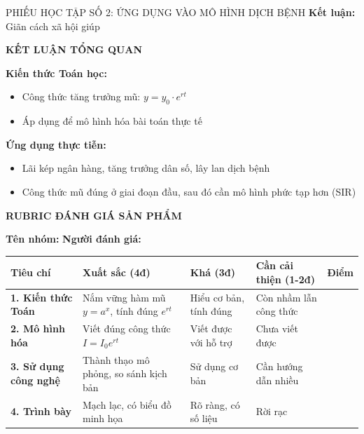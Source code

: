 \documentclass[12pt,a4paper]{article}
\begin{document}
\begin{phieuhoctap}{PHIẾU HỌC TẬP SỐ 2: ỨNG DỤNG VÀO MÔ HÌNH DỊCH BỆNH}
\textbf{Kết luận:} Giãn cách xã hội giúp \underline{\hspace{6cm}}

\vspace{0.5cm}
\textbf{\color{primary}KẾT LUẬN TỔNG QUAN}

\textbf{Kiến thức Toán học:}
\begin{itemize}
\item Công thức tăng trưởng mũ: $y = y_0 \cdot e^{rt}$
\item Áp dụng để mô hình hóa bài toán thực tế
\end{itemize}

\textbf{Ứng dụng thực tiễn:}
\begin{itemize}
\item Lãi kép ngân hàng, tăng trưởng dân số, lây lan dịch bệnh
\item Công thức mũ đúng ở giai đoạn đầu, sau đó cần mô hình phức tạp hơn (SIR)
\end{itemize}

\end{phieuhoctap}

\newpage
\begin{center}
{\Large\bfseries\sffamily\color{primary} RUBRIC ĐÁNH GIÁ SẢN PHẨM}
\end{center}

\vspace{0.3cm}
\noindent\textbf{Tên nhóm:} \underline{\hspace{4cm}} \hfill \textbf{Người đánh giá:} \underline{\hspace{4cm}}

\vspace{0.5cm}
\begin{tabularx}{\textwidth}{|>{\raggedright\arraybackslash}p{2.5cm}|X|X|X|c|}
\hline
\rowcolor{TableHeader}
\sffamily\bfseries Tiêu chí & \sffamily\bfseries Xuất sắc (4đ) & \sffamily\bfseries Khá (3đ) & \sffamily\bfseries Cần cải thiện (1-2đ) & \sffamily\bfseries Điểm \\
\hline
\textbf{1. Kiến thức Toán} & Nắm vững hàm mũ $y=a^x$, tính đúng $e^{rt}$ & Hiểu cơ bản, tính đúng & Còn nhầm lẫn công thức & \underline{\hspace{1cm}} \\
\hline
\textbf{2. Mô hình hóa} & Viết đúng công thức $I=I_0 e^{rt}$ & Viết được với hỗ trợ & Chưa viết được & \underline{\hspace{1cm}} \\
\hline
\textbf{3. Sử dụng công nghệ} & Thành thạo mô phỏng, so sánh kịch bản & Sử dụng cơ bản & Cần hướng dẫn nhiều & \underline{\hspace{1cm}} \\
\hline
\textbf{4. Trình bày} & Mạch lạc, có biểu đồ minh họa & Rõ ràng, có số liệu & Rời rạc & \underline{\hspace{1cm}} \\
\hline
\end{tabularx}
\end{document}
